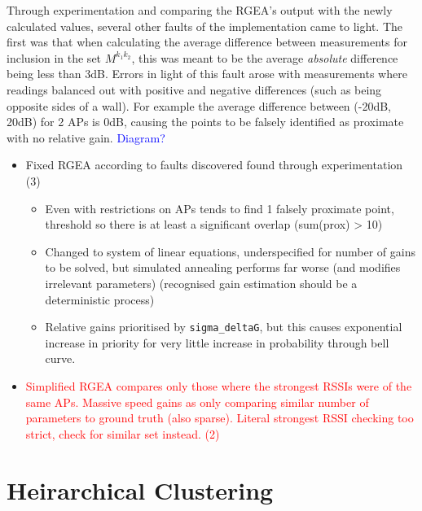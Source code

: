 \documentclass{UoYCSproject}
\begin{document}
            Through experimentation and comparing the RGEA's output with the newly calculated values, several other faults of the implementation came to light. The first was that when calculating the average difference between measurements for inclusion in the set $M^{k_1k_2}$, this was meant to be the average \emph{absolute} difference being less than 3dB. Errors in light of this fault arose with measurements where readings balanced out with positive and negative differences (such as being opposite sides of a wall). For example the average difference between (-20dB, 20dB) for 2 APs is 0dB, causing the points to be falsely identified as proximate with no relative gain. \textcolor{blue}{Diagram?}
		
			\begin{itemize}
				\item Fixed RGEA according to faults discovered found through experimentation (3)
				\begin{itemize}
					\item Even with restrictions on APs tends to find 1 falsely proximate point, threshold so there is at least a significant overlap (sum(prox) > 10)
					\item Changed to system of linear equations, underspecified for number of gains to be solved, but simulated annealing performs far worse (and modifies irrelevant parameters) (recognised gain estimation should be a deterministic process)
					\item Relative gains prioritised by \texttt{sigma\_deltaG}, but this causes exponential increase in priority for very little increase in probability through bell curve.
				\end{itemize}
				\item \textcolor{red}{Simplified RGEA compares only those where the strongest RSSIs were of the same APs. Massive speed gains as only comparing similar number of parameters to ground truth (also sparse). Literal strongest RSSI checking too strict, check for similar set instead. (2)}
			\end{itemize}
		
		\section{Heirarchical Clustering}
        \label{sec:datacluster}
		
\end{document}
